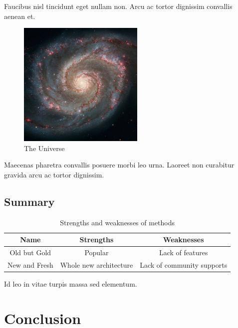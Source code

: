 \documentclass[12pt]{article}
\begin{document}
Faucibus nisl tincidunt eget nullam non.
Arcu ac tortor dignissim convallis aenean et.


\begin{figure}[ht]
    \centering
    \includegraphics[width=6cm]{img/universe.jpg}
    \caption{The Universe}
    \label{fig:universe}
\end{figure}


Maecenas pharetra convallis posuere morbi leo urna.
Laoreet non curabitur gravida arcu ac tortor dignissim.

\subsection{Summary}

\blindtext


\begin{table}[ht]
\centering
    \begin{tabular}{c | c | c}
        Name & Strengths & Weaknesses \\
        \hline
        Old but Gold & Popular & Lack of features \\
        New and Fresh & Whole new architecture & Lack of community supports
    \end{tabular}
\caption{Strengths and weaknesses of methods}
\label{tab:method summary}
\end{table}


Id leo in vitae turpis massa sed elementum.
\Blindtext[2]



\section{Conclusion}



\blindtext
\end{document}
